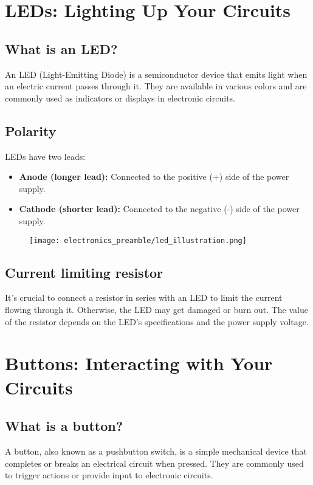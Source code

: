 \section{LEDs: Lighting Up Your Circuits}
\subsection{What is an LED?}
An LED (Light-Emitting Diode) is a semiconductor device that emits light when an electric current
passes through it. They are available in various colors and are commonly used as indicators or
displays in electronic circuits.

\subsection{Polarity}
LEDs have two leads:
\begin{itemize}
\item \textbf{Anode (longer lead):} Connected to the positive (+) side of the power supply.
\item \textbf{Cathode (shorter lead):} Connected to the negative (-) side of the power supply.
\end{itemize}

\begin{figure}[H]
\centering
    \texttt{[image: electronics\_preamble/led\_illustration.png]}
\end{figure}

\subsection{Current limiting resistor}
It's crucial to connect a resistor in series with an LED to limit the current flowing through it.
Otherwise, the LED may get damaged or burn out. The value of the resistor depends on the LED's
specifications and the power supply voltage.

\section{Buttons: Interacting with Your Circuits}
\subsection{What is a button?}
A button, also known as a pushbutton switch, is a simple mechanical device that completes or breaks
an electrical circuit when pressed. They are commonly used to trigger actions or provide input to
electronic circuits.

